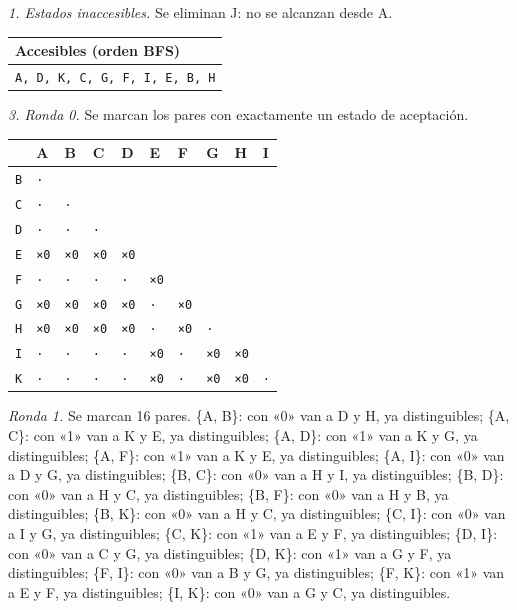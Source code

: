 \documentclass[11pt]{article}
\begin{document}
\textit{1. Estados inaccesibles.} Se eliminan J: no se alcanzan desde A.
\begin{center}\footnotesize\begin{tabular}{l}\toprule
Accesibles (orden BFS) \\\midrule
\texttt{A, D, K, C, G, F, I, E, B, H} \\
\bottomrule\end{tabular}\end{center}
\textit{3. Ronda 0.} Se marcan los pares con exactamente un estado de aceptación.
\begin{center}\footnotesize\begin{tabular}{llllllllll}\toprule
 & A & B & C & D & E & F & G & H & I \\\midrule
\texttt{B} & \texttt{·} & \texttt{} & \texttt{} & \texttt{} & \texttt{} & \texttt{} & \texttt{} & \texttt{} & \texttt{} \\
\texttt{C} & \texttt{·} & \texttt{·} & \texttt{} & \texttt{} & \texttt{} & \texttt{} & \texttt{} & \texttt{} & \texttt{} \\
\texttt{D} & \texttt{·} & \texttt{·} & \texttt{·} & \texttt{} & \texttt{} & \texttt{} & \texttt{} & \texttt{} & \texttt{} \\
\texttt{E} & \texttt{×0} & \texttt{×0} & \texttt{×0} & \texttt{×0} & \texttt{} & \texttt{} & \texttt{} & \texttt{} & \texttt{} \\
\texttt{F} & \texttt{·} & \texttt{·} & \texttt{·} & \texttt{·} & \texttt{×0} & \texttt{} & \texttt{} & \texttt{} & \texttt{} \\
\texttt{G} & \texttt{×0} & \texttt{×0} & \texttt{×0} & \texttt{×0} & \texttt{·} & \texttt{×0} & \texttt{} & \texttt{} & \texttt{} \\
\texttt{H} & \texttt{×0} & \texttt{×0} & \texttt{×0} & \texttt{×0} & \texttt{·} & \texttt{×0} & \texttt{·} & \texttt{} & \texttt{} \\
\texttt{I} & \texttt{·} & \texttt{·} & \texttt{·} & \texttt{·} & \texttt{×0} & \texttt{·} & \texttt{×0} & \texttt{×0} & \texttt{} \\
\texttt{K} & \texttt{·} & \texttt{·} & \texttt{·} & \texttt{·} & \texttt{×0} & \texttt{·} & \texttt{×0} & \texttt{×0} & \texttt{·} \\
\bottomrule\end{tabular}\end{center}
\textit{Ronda 1.} Se marcan 16 pares. \{A, B\}: con «0» van a D y H, ya distinguibles; \{A, C\}: con «1» van a K y E, ya distinguibles; \{A, D\}: con «1» van a K y G, ya distinguibles; \{A, F\}: con «1» van a K y E, ya distinguibles; \{A, I\}: con «0» van a D y G, ya distinguibles; \{B, C\}: con «0» van a H y I, ya distinguibles; \{B, D\}: con «0» van a H y C, ya distinguibles; \{B, F\}: con «0» van a H y B, ya distinguibles; \{B, K\}: con «0» van a H y C, ya distinguibles; \{C, I\}: con «0» van a I y G, ya distinguibles; \{C, K\}: con «1» van a E y F, ya distinguibles; \{D, I\}: con «0» van a C y G, ya distinguibles; \{D, K\}: con «1» van a G y F, ya distinguibles; \{F, I\}: con «0» van a B y G, ya distinguibles; \{F, K\}: con «1» van a E y F, ya distinguibles; \{I, K\}: con «0» van a G y C, ya distinguibles.
\end{document}
